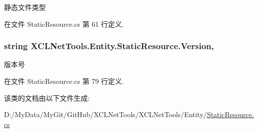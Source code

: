 静态文件类型 



在文件 Static\-Resource.\-cs 第 61 行定义.

\hypertarget{class_x_c_l_net_tools_1_1_entity_1_1_static_resource_a4b85a7d2f6dc6169a10ebfe2987f2404}{
\subsubsection[{Version}]{\setlength{\rightskip}{0pt plus 5cm}string X\-C\-L\-Net\-Tools.\-Entity.\-Static\-Resource.\-Version\hspace{0.3cm}{\ttfamily [get]}, {\ttfamily [set]}}}\label{class_x_c_l_net_tools_1_1_entity_1_1_static_resource_a4b85a7d2f6dc6169a10ebfe2987f2404}


版本号 



在文件 Static\-Resource.\-cs 第 79 行定义.



该类的文档由以下文件生成\-:\begin{DoxyCompactItemize}
\item 
D\-:/\-My\-Data/\-My\-Git/\-Git\-Hub/\-X\-C\-L\-Net\-Tools/\-X\-C\-L\-Net\-Tools/\-Entity/\hyperlink{_static_resource_8cs}{Static\-Resource.\-cs}\end{DoxyCompactItemize}
